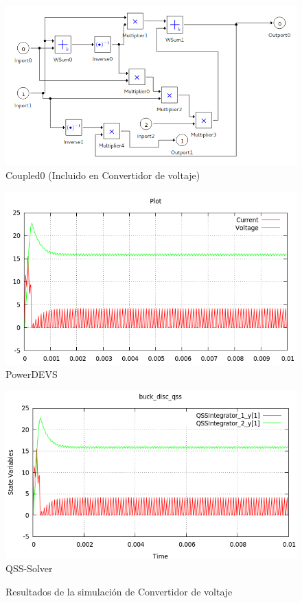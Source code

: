 \begin{figure}[H]
\includegraphics[width=0.75\linewidth]{buck_disk_coupled0}
\caption{Coupled0 (Incluido en Convertidor de voltaje)}
\label{model:buckdisk_coupled0}
\end{figure}

\begin{figure}[H]
\begin{minipage}{0.5\textwidth}
 \includegraphics[width=\linewidth]{buck_disk-pd}
\centering
PowerDEVS
\label{model:buckdisk_coupled0}
\end{minipage}\hfill
\begin{minipage}{0.5\textwidth}
 \includegraphics[width=\linewidth]{buck_disk-qss}
\centering
QSS-Solver
\label{model:buckdisk}
\end{minipage}
\caption{Resultados de la simulación de Convertidor de voltaje}
\end{figure}

